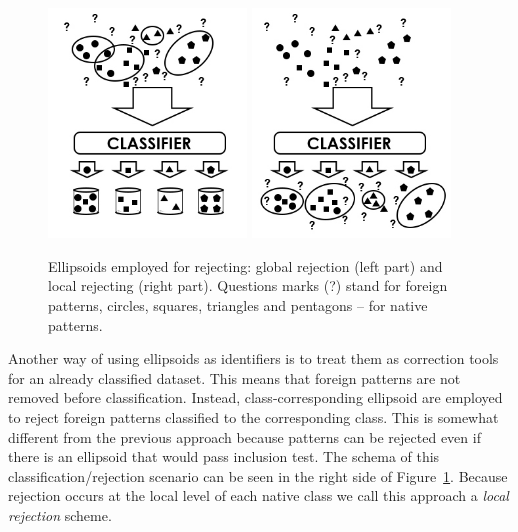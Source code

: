 \documentclass{llncs}
\begin{document}
\begin{figure}[!t]
\vspace{-12pt}
  \centering
  \includegraphics[width=0.47\textwidth]{_Figures/Classification1.jpg}\hspace{12pt}
	\includegraphics[width=0.47\textwidth]{_Figures/Classification2.jpg}
\vspace{-6pt}
  \caption{Ellipsoids employed for rejecting: global rejection (left part) and local rejecting (right part). Questions marks (?) stand for foreign patterns, circles, squares, triangles and pentagons -- for native patterns.}
\label{fig:nativeforeignpatternsClassification1}
\vspace{-6pt}
\end{figure}

Another way of using ellipsoids as identifiers is to treat them as correction tools for an already classified dataset. This means that foreign patterns are not removed before classification. Instead, class-corresponding ellipsoid are employed to reject foreign patterns classified to the corresponding class. %
This is somewhat different from the previous approach because patterns can be rejected even if there is an ellipsoid that would pass inclusion test. The schema of this classification/rejection scenario can be seen in the right side of Figure~\ref{fig:nativeforeignpatternsClassification1}. Because rejection occurs at the local level of each native class we call this approach a \textit{local rejection} scheme.
\end{document}
